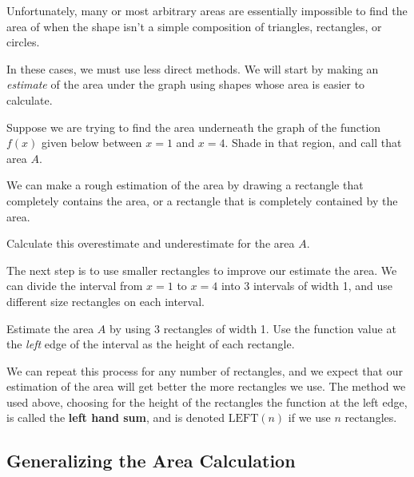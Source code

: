 Unfortunately, many or most arbitrary areas are essentially impossible
to find the area of when the shape isn't a simple composition of
triangles, rectangles, or circles.

In these cases, we must use less direct methods.  We will start by
making an {\em estimate} of the area under the graph using shapes
whose area is easier to calculate.

\newpage

\problem Suppose we are trying to find the area underneath the graph of the
function $f(x)$ given below between $x = 1$ and $x=4$.  Shade in that
region, and call that area $A$.

\begin{center}
\end{center}


\newpage
We can make a rough estimation of the area by drawing a rectangle that
completely contains the area, or a rectangle that is completely
contained by the area.


\problem 
{Calculate this overestimate and underestimate for the
  area $A$.}
  
\hfill %


\newpage The next step is to use smaller rectangles to improve our
estimate the area.  We can divide the interval from $x = 1$ to $x = 4$
into 3 intervals of width 1, and use different size rectangles on each
interval.



\problem Estimate the area $A$ by using 3 rectangles of width 1.
  Use the function value at the {\em left} edge of the interval as the
  height of each rectangle.

\hfill %

\newpage

We can repeat this process for any number of rectangles, and we expect
that our estimation of the area will get better the more rectangles we
use.  The method we used above, choosing for the height of the
rectangles the function at the left edge, is called the {\bf left hand
  sum}, and is denoted $\mbox{LEFT}(n)$ if we use $n$ rectangles.

\newpage

\subsection*{Generalizing the Area Calculation}

